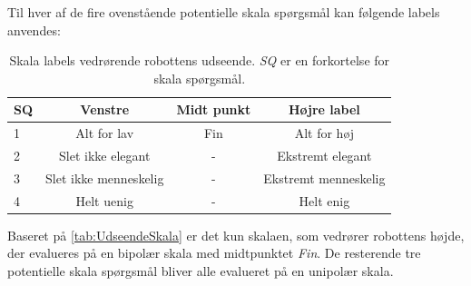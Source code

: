 \newpage
%
Til hver af de fire ovenstående potentielle skala spørgsmål kan følgende labels anvendes:
%
\begin{table}[H]
	\centering
	\begin{tabular}{l|c|c|c}
		SQ     & Venstre & Midt punkt & Højre label \\\hline
		1   & Alt for lav  & Fin & Alt for høj        \\\hline
		2   & Slet ikke elegant & - & Ekstremt elegant         \\\hline
		3   & Slet ikke menneskelig & - & Ekstremt menneskelig         \\\hline
	 	4   & Helt uenig & - & Helt enig                   
	\end{tabular}  
	\caption{Skala labels vedrørende robottens udseende. \textit{SQ} er en forkortelse for skala spørgsmål.}
	\label{tab:UdseendeSkala}       
\end{table}
\noindent
%
Baseret på \autoref{tab:UdseendeSkala} er det kun skalaen, som vedrører robottens højde, der evalueres på en bipolær skala med midtpunktet \textit{Fin}. De resterende tre potentielle skala spørgsmål bliver alle evalueret på en unipolær skala. 
%
